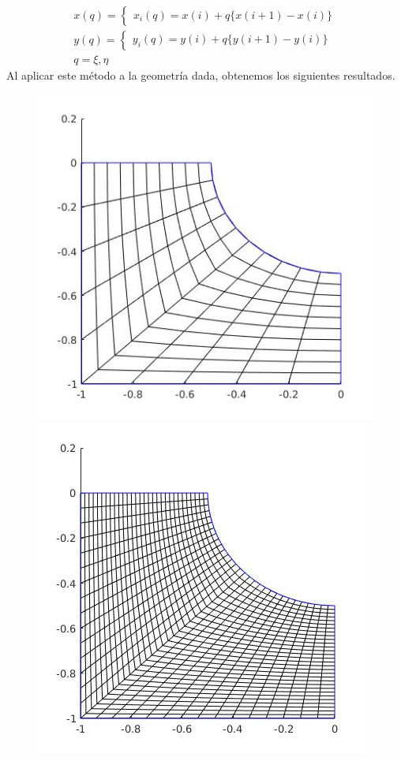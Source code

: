 \documentclass[11pt,letterpaper]{article}
\begin{document}
		\begin{gather*}
			x(q) = 
			\begin{cases}
				x_{i}(q) = x(i) + q \lbrace x(i + 1) - x(i) \rbrace
			\end{cases}
			\\
			y(q) = 
			\begin{cases}
				y_{i}(q) = y(i) + q \lbrace y(i + 1) - y(i) \rbrace
			\end{cases}
			\\
			q = {\xi, \eta}
		\end{gather*}
		Al aplicar este m\'etodo a la geometr\'ia dada, obtenemos los siguientes resultados.
		\begin{figure}[H]
			\begin{minipage}{.49\linewidth}
				\centering
				\includegraphics[scale=0.41]{./imgs/img_alg_generator_size_10.jpg}
			\end{minipage}
			\begin{minipage}{.49\linewidth}
				\centering
				\includegraphics[scale=0.41]{./imgs/img_alg_generator_size_30.jpg}

\end{minipage}
\end{figure}
\end{document}
